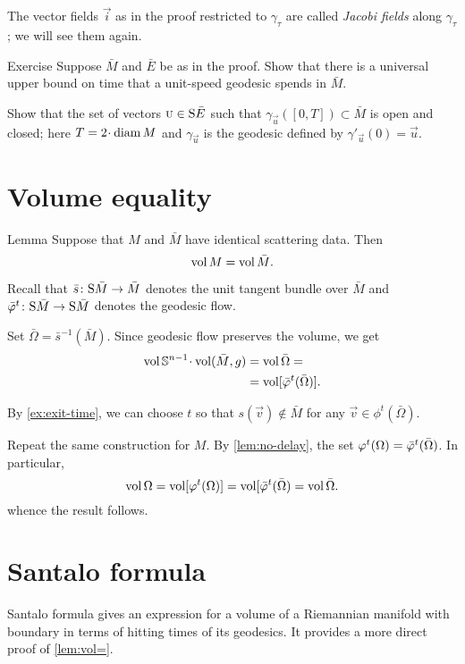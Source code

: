  The vector fields $\vec i$  as in the proof restricted to $\gamma_\tau$ are called \emph{Jacobi fields} along $\gamma_\tau$;
we will see them again.

\begin{thm}{Exercise}\label{ex:exit-time}
Suppose $\bar M$ and $\bar E$ be as in the proof.
Show that there is a universal upper bound on time that a unit-speed geodesic spends in $\bar M$.
\end{thm}

 Show that the set of vectors $\vec u\in\S \bar E$ such that $\gamma_{\vec u}([0, T])\subset \bar M$ is open and closed;
here $T=2\cdot\diam M$ and $\gamma_{\vec u}$ is the geodesic defined by $\gamma'_{\vec u}(0)=\vec u$.

\section{Volume equality}

\begin{thm}{Lemma}\label{lem:vol=}
Suppose that $M$ and $\bar M$ have identical scattering data.
Then 
\[\vol M=\vol \bar M.\]

\end{thm}

Recall that $\bar s\:\S \bar M\to \bar M$ denotes the unit tangent bundle over $\bar M$
and $\bar\phi^t\:\S \bar M\to \S \bar M$ denotes the geodesic flow.

Set $\bar\Omega=\bar s^{-1}(\bar M)$.
Since geodesic flow preserves the volume, we get 
\begin{align*}
\vol\SSS^{n-1}\cdot\vol(\bar M,g)&=\vol\bar\Omega=
\\
&=\vol[\bar\phi^t(\bar\Omega)].
\end{align*}

By \ref{ex:exit-time}, we can choose $t$ so that $s(\vec v)\notin \bar M$ for any $\vec v\in \phi^t(\bar\Omega)$.

Repeat the same construction for $M$. 
By \ref{lem:no-delay}, the set $\phi^t(\Omega)\z=\bar\phi^t(\bar\Omega)$.
In particular, 
\[
\vol\Omega=
\vol[\phi^t(\Omega)]=\vol[\bar\phi^t(\bar\Omega)=\vol\bar\Omega.
\]
whence the result follows.
\qeds

\section{Santalo formula}

Santalo formula gives an expression for a volume of a Riemannian manifold with boundary in terms of hitting times of its geodesics.
It provides a more direct proof of \ref{lem:vol=}.

